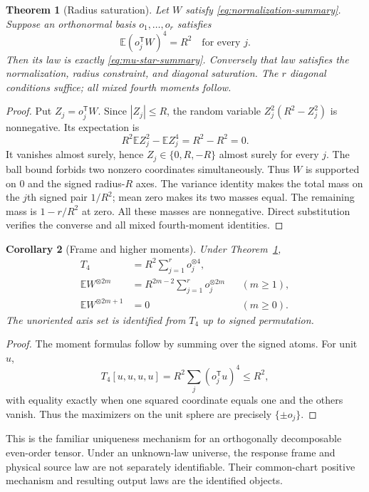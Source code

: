 \documentclass[11pt]{article}
\newtheorem{theorem}{Theorem}[section]
\newtheorem{corollary}[theorem]{Corollary}
\theoremstyle{definition}
\theoremstyle{remark}
\newcommand{\E}{\mathbb E}
\newcommand{\trans}{\mathsf T}
\newcommand{\tensor}[2]{#1^{\otimes #2}}
\begin{document}
\begin{theorem}[Radius saturation]
\label{thm:saturation}
Let $W$ satisfy \eqref{eq:normalization-summary}. Suppose an orthonormal
basis $o_1,\ldots,o_r$ satisfies
\begin{equation}
\E(o_j^\trans W)^4=R^2\quad\text{for every }j.
\label{eq:diagonal-saturation}
\end{equation}
Then its law is exactly \eqref{eq:mu-star-summary}. Conversely that law
satisfies the normalization, radius constraint, and diagonal saturation.
The $r$ diagonal conditions suffice; all mixed fourth moments follow.
\end{theorem}
\begin{proof}
Put $Z_j=o_j^\trans W$. Since $|Z_j|\le R$, the random variable
$Z_j^2(R^2-Z_j^2)$ is nonnegative. Its expectation is
\[
R^2\E Z_j^2-\E Z_j^4=R^2-R^2=0.
\]
It vanishes almost surely, hence $Z_j\in\{0,R,-R\}$ almost surely for
every $j$. The ball bound forbids two nonzero coordinates simultaneously.
Thus $W$ is supported on $0$ and the signed radius-$R$ axes. The variance
identity makes the total mass on the $j$th signed pair $1/R^2$; mean zero
makes its two masses equal. The remaining mass is $1-r/R^2$ at zero.
All these masses are nonnegative. Direct substitution verifies the
converse and all mixed fourth-moment identities.
\end{proof}

\begin{corollary}[Frame and higher moments]
\label{cor:axes}
Under Theorem~\ref{thm:saturation},
\begin{align}
T_4&=R^2\sum_{j=1}^r\tensor{o_j}{4},\label{eq:t4}\\
\E\tensor{W}{2m}&=R^{2m-2}\sum_{j=1}^r\tensor{o_j}{2m}
&& (m\ge1),\label{eq:even}\\
\E\tensor{W}{2m+1}&=0 &&(m\ge0).\label{eq:odd}
\end{align}
The unoriented axis set is identified from $T_4$ up to signed permutation.
\end{corollary}
\begin{proof}
The moment formulas follow by summing over the signed atoms. For unit $u$,
\[
T_4[u,u,u,u]=R^2\sum_j(o_j^\trans u)^4\le R^2,
\]
with equality exactly when one squared coordinate equals one and the
others vanish. Thus the maximizers on the unit sphere are precisely
$\{\pm o_j\}$.
\end{proof}

This is the familiar uniqueness mechanism for an orthogonally decomposable
even-order tensor. Under an unknown-law universe, the response frame and
physical source law are not separately identifiable. Their common-chart
positive mechanism and resulting output laws are the identified objects.
\end{document}
